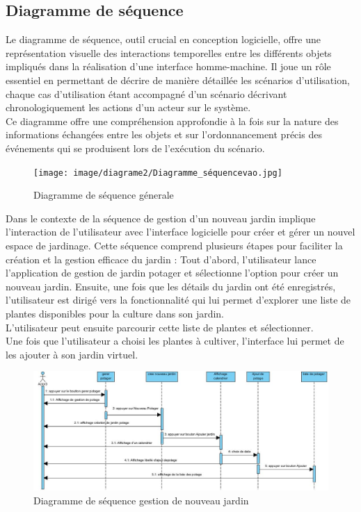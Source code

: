 \subsection{Diagramme de séquence}
Le diagramme de séquence, outil crucial en conception logicielle, offre une représentation visuelle des interactions temporelles entre les différents objets impliqués dans la réalisation d’une interface homme-machine. Il joue un rôle essentiel en permettant de décrire de manière détaillée les scénarios d'utilisation, chaque cas d'utilisation étant accompagné d'un scénario décrivant chronologiquement les actions d'un acteur sur le système.\\
 Ce diagramme offre une compréhension approfondie à la fois sur la nature des informations échangées entre les objets et sur l’ordonnancement précis des événements qui se produisent lors de l'exécution du scénario.\\
	\begin{figure}[H]
    	\center
    		\texttt{[image: image/diagrame2/Diagramme\_séquencevao.jpg]}
   		\caption{Diagramme de séquence génerale}
    	\label{Diagramme de séquence génerale}
	\end{figure}
	
	Dans le contexte de la séquence de gestion d'un nouveau jardin implique l'interaction de l'utilisateur avec l'interface logicielle pour créer et gérer un nouvel espace de jardinage. Cette séquence comprend plusieurs étapes pour faciliter la création et la gestion efficace du jardin :
Tout d'abord, l'utilisateur lance l'application de gestion de jardin potager et sélectionne l'option pour créer un nouveau jardin. 
Ensuite, une fois que les détails du jardin ont été enregistrés, l'utilisateur est dirigé vers la fonctionnalité qui lui permet d'explorer une liste de plantes disponibles pour la culture dans son jardin. \\
L'utilisateur peut ensuite parcourir cette liste de plantes et sélectionner. \\
Une fois que l'utilisateur a choisi les plantes à cultiver, l'interface lui permet de les ajouter à son jardin virtuel. \\
	\begin{figure}[!h]
    	\center
    		\includegraphics[width=1\textwidth]{image/diagrame2/Gerer_potager.jpg}
   		\caption{Diagramme de séquence gestion de nouveau jardin}
    	\label{Diagramme de séquence gestion de nouveau jardin}
	\end{figure}
	
